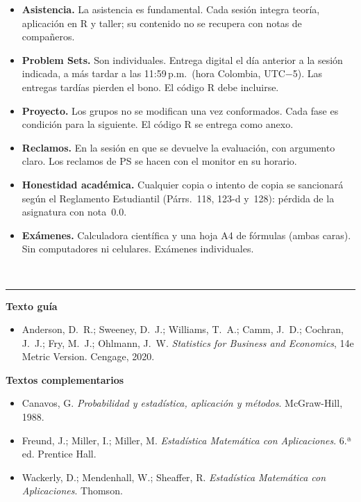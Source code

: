 \documentclass[11pt, a4paper]{article}
\newcommand{\sechead}[1]{%
  \vspace{10pt}%
  \noindent{\large\bfseries #1}\\[-6pt]%
  \rule{\linewidth}{0.5pt}%
  \vspace{2pt}%
}
\begin{document}
\begin{itemize}
  \item \textbf{Asistencia.} La asistencia es fundamental. Cada sesi\'on integra teor\'ia,
        aplicaci\'on en R y taller; su contenido no se recupera con notas de compa\~neros.
  \item \textbf{Problem Sets.} Son individuales. Entrega digital el d\'ia anterior a la
        sesi\'on indicada, a m\'as tardar a las 11:59\,p.m.\ (hora Colombia, UTC$-$5).
        Las entregas tard\'ias pierden el bono. El c\'odigo R debe incluirse.
  \item \textbf{Proyecto.} Los grupos no se modifican una vez conformados.
        Cada fase es condici\'on para la siguiente. El c\'odigo R se entrega como anexo.
  \item \textbf{Reclamos.} En la sesi\'on en que se devuelve la evaluaci\'on, con argumento
        claro. Los reclamos de PS se hacen con el monitor en su horario.
  \item \textbf{Honestidad acad\'emica.} Cualquier copia o intento de copia se sancionar\'a
        seg\'un el Reglamento Estudiantil (P\'arrs.~118, 123-d y~128):
        p\'erdida de la asignatura con nota~0.0.
  \item \textbf{Ex\'amenes.} Calculadora cient\'ifica y una hoja A4 de f\'ormulas (ambas caras).
        Sin computadores ni celulares. Ex\'amenes individuales.
\end{itemize}

\sechead{Fuentes de Informaci\'on}

\textbf{Texto gu\'ia}
\begin{itemize}
  \item Anderson, D.~R.; Sweeney, D.~J.; Williams, T.~A.; Camm, J.~D.; Cochran, J.~J.;
        Fry, M.~J.; Ohlmann, J.~W. \textit{Statistics for Business and Economics},
        14e Metric Version. Cengage, 2020.
\end{itemize}

\textbf{Textos complementarios}
\begin{itemize}
  \item Canavos, G. \textit{Probabilidad y estad\'istica, aplicaci\'on y m\'etodos}. McGraw-Hill, 1988.
  \item Freund, J.; Miller, I.; Miller, M. \textit{Estad\'istica Matem\'atica con Aplicaciones}.
        6.ª ed. Prentice Hall.
  \item Wackerly, D.; Mendenhall, W.; Sheaffer, R. \textit{Estad\'istica Matem\'atica con
        Aplicaciones}. Thomson.
\end{itemize}
\end{document}

